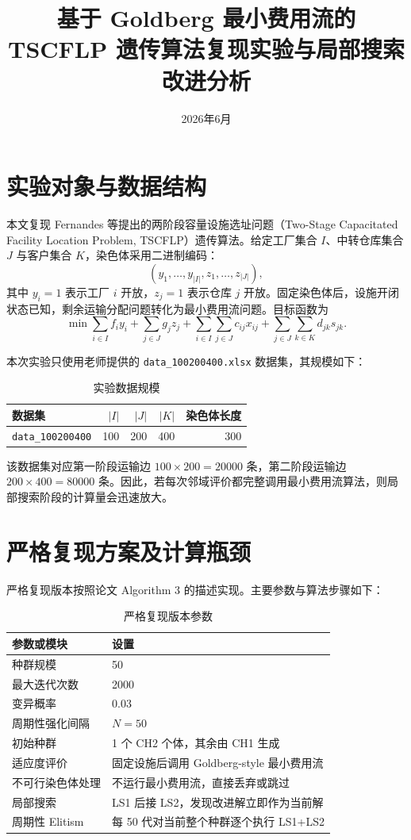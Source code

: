 \documentclass{article}
\title{基于 Goldberg 最小费用流的 TSCFLP 遗传算法复现实验与局部搜索改进分析}
\author{}
\date{2026年6月}
\begin{document}
\maketitle

\section{实验对象与数据结构}

本文复现 Fernandes 等提出的两阶段容量设施选址问题（Two-Stage Capacitated Facility Location Problem, TSCFLP）遗传算法。给定工厂集合 $I$、中转仓库集合 $J$ 与客户集合 $K$，染色体采用二进制编码：
\[
    (y_1,\ldots,y_{|I|},z_1,\ldots,z_{|J|}),
\]
其中 $y_i=1$ 表示工厂 $i$ 开放，$z_j=1$ 表示仓库 $j$ 开放。固定染色体后，设施开闭状态已知，剩余运输分配问题转化为最小费用流问题。目标函数为
\[
    \min \sum_{i\in I} f_i y_i+\sum_{j\in J} g_j z_j
    +\sum_{i\in I}\sum_{j\in J} c_{ij}x_{ij}
    +\sum_{j\in J}\sum_{k\in K} d_{jk}s_{jk}.
\]

本次实验只使用老师提供的 \texttt{data\_100200400.xlsx} 数据集，其规模如下：

\begin{table}[H]
\centering
\caption{实验数据规模}
\begin{tabular}{lrrrr}
\toprule
数据集 & $|I|$ & $|J|$ & $|K|$ & 染色体长度 \\
\midrule
\texttt{data\_100200400} & 100 & 200 & 400 & 300 \\
\bottomrule
\end{tabular}
\end{table}

该数据集对应第一阶段运输边 $100\times 200=20000$ 条，第二阶段运输边 $200\times 400=80000$ 条。因此，若每次邻域评价都完整调用最小费用流算法，则局部搜索阶段的计算量会迅速放大。

\section{严格复现方案及计算瓶颈}

严格复现版本按照论文 Algorithm 3 的描述实现。主要参数与算法步骤如下：

\begin{table}[H]
\centering
\caption{严格复现版本参数}
\begin{tabular}{ll}
\toprule
参数或模块 & 设置 \\
\midrule
种群规模 & 50 \\
最大迭代次数 & 2000 \\
变异概率 & 0.03 \\
周期性强化间隔 & $N=50$ \\
初始种群 & 1 个 CH2 个体，其余由 CH1 生成 \\
适应度评价 & 固定设施后调用 Goldberg-style 最小费用流 \\
不可行染色体处理 & 不运行最小费用流，直接丢弃或跳过 \\
局部搜索 & LS1 后接 LS2，发现改进解立即作为当前解 \\
周期性 Elitism & 每 50 代对当前整个种群逐个执行 LS1+LS2 \\
\bottomrule
\end{tabular}
\end{table}
\end{document}
